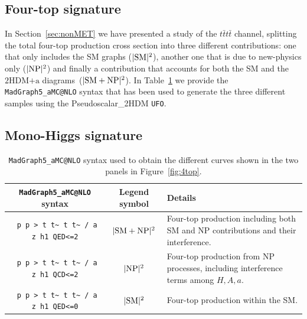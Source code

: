 \documentclass[a4paper, 11pt,notoc]{article}
\newcommand{\hdma}{\ensuremath{\textrm{2HDM+a}}\xspace}
\begin{document}
\subsection*{Four-top signature}

In Section~\ref{sec:nonMET} we have presented a study of the $t \bar t t \bar t$ channel, splitting the  total four-top production cross section into three different contributions: one that only includes the SM graphs ($|{\rm SM}|^2$), another one that is due to new-physics only ($|{\rm NP}|^2$) and finally a contribution that accounts for both the SM and the \hdma diagrams~($|{\rm SM} + {\rm NP}|^2$). In Table~\ref{tab-dmhf-4tops} we provide the {\tt MadGraph5\_aMC@NLO} syntax that has been used to generate the three different samples using the Pseudoscalar\_2HDM {\tt UFO}. 

\subsection*{Mono-Higgs signature}

\begin{table}[t!]
\begin{tabular}{ccm{50mm}}
\toprule
 {\tt MadGraph5\_aMC@NLO} syntax & Legend symbol & Details \\\midrule
\verb| p p > t t~ t t~ / a z h1 QED<=2|& $|{\rm SM}+{\rm NP}|^2$ & Four-top
production including both SM and NP contributions and their
interference. \\\midrule
\verb| p p > t t~ t t~ / a z h1 QCD<=2|& $|{\rm NP}|^2$ & Four-top
production from NP processes, including interference terms among
$H,A,a$. \\\midrule
\verb| p p > t t~ t t~ / a z h1 QED<=0|& $|{\rm SM}|^2$ & Four-top 
production within the SM.\\
\bottomrule
\end{tabular}
\vspace{4mm} 
\caption{{\tt MadGraph5\_aMC@NLO} syntax used to obtain the different curves shown in the two panels in Figure~\ref{fig:4top}.}
\label{tab-dmhf-4tops}
\end{table}
\end{document}
